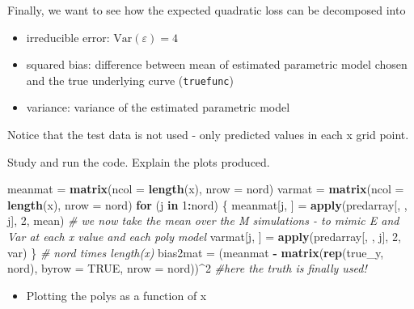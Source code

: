 \documentclass[]{article}
\newenvironment{Shaded}{\begin{snugshade}}{\end{snugshade}}
\newcommand{\KeywordTok}[1]{\textcolor[rgb]{0.13,0.29,0.53}{\textbf{#1}}}
\newcommand{\DataTypeTok}[1]{\textcolor[rgb]{0.13,0.29,0.53}{#1}}
\newcommand{\DecValTok}[1]{\textcolor[rgb]{0.00,0.00,0.81}{#1}}
\newcommand{\StringTok}[1]{\textcolor[rgb]{0.31,0.60,0.02}{#1}}
\newcommand{\CommentTok}[1]{\textcolor[rgb]{0.56,0.35,0.01}{\textit{#1}}}
\newcommand{\OtherTok}[1]{\textcolor[rgb]{0.56,0.35,0.01}{#1}}
\newcommand{\ControlFlowTok}[1]{\textcolor[rgb]{0.13,0.29,0.53}{\textbf{#1}}}
\newcommand{\OperatorTok}[1]{\textcolor[rgb]{0.81,0.36,0.00}{\textbf{#1}}}
\newcommand{\NormalTok}[1]{#1}
\providecommand{\tightlist}{%
  \setlength{\itemsep}{0pt}\setlength{\parskip}{0pt}}
\begin{document}
Finally, we want to see how the expected quadratic loss can be
decomposed into

\begin{itemize}
\tightlist
\item
  irreducible error: \(\text{Var}(\varepsilon)=4\)
\item
  squared bias: difference between mean of estimated parametric model
  chosen and the true underlying curve (\texttt{truefunc})
\item
  variance: variance of the estimated parametric model
\end{itemize}

Notice that the test data is not used - only predicted values in each x
grid point.

Study and run the code. Explain the plots produced.

\begin{Shaded}
\begin{Highlighting}[]
\NormalTok{meanmat =}\StringTok{ }\KeywordTok{matrix}\NormalTok{(}\DataTypeTok{ncol =} \KeywordTok{length}\NormalTok{(x), }\DataTypeTok{nrow =}\NormalTok{ nord)}
\NormalTok{varmat =}\StringTok{ }\KeywordTok{matrix}\NormalTok{(}\DataTypeTok{ncol =} \KeywordTok{length}\NormalTok{(x), }\DataTypeTok{nrow =}\NormalTok{ nord)}
\ControlFlowTok{for}\NormalTok{ (j }\ControlFlowTok{in} \DecValTok{1}\OperatorTok{:}\NormalTok{nord) \{}
\NormalTok{    meanmat[j, ] =}\StringTok{ }\KeywordTok{apply}\NormalTok{(predarray[, , j], }\DecValTok{2}\NormalTok{, mean)  }\CommentTok{# we now take the mean over the M simulations - to mimic E and Var at each x value and each poly model}
\NormalTok{    varmat[j, ] =}\StringTok{ }\KeywordTok{apply}\NormalTok{(predarray[, , j], }\DecValTok{2}\NormalTok{, var)}
\NormalTok{\}}
\CommentTok{# nord times length(x)}
\NormalTok{bias2mat =}\StringTok{ }\NormalTok{(meanmat }\OperatorTok{-}\StringTok{ }\KeywordTok{matrix}\NormalTok{(}\KeywordTok{rep}\NormalTok{(true_y, nord), }\DataTypeTok{byrow =} \OtherTok{TRUE}\NormalTok{, }\DataTypeTok{nrow =}\NormalTok{ nord))}\OperatorTok{^}\DecValTok{2}  \CommentTok{#here the truth is finally used!}
\end{Highlighting}
\end{Shaded}

\begin{itemize}
\tightlist
\item
  Plotting the polys as a function of x
\end{itemize}
\end{document}
